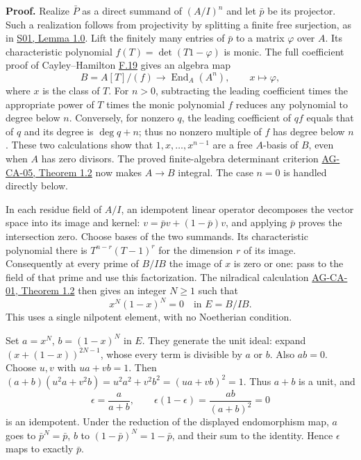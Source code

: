 \documentclass[11pt,a4paper,openany]{report}
\begin{document}
\textbf{Proof.} Realize \(\bar P\) as a direct summand of \((A/I)^n\) and let \(\bar p\) be its projector. Such a realization follows from projectivity by splitting a finite free surjection, as in \href{https://github.com/KokunoYumeto/open-math-courses/blob/main/docs/courses/AG-RG/AG-RG-S01.md}{S01, Lemma 1.0}. Lift the finitely many entries of \(\bar p\) to a matrix \(\varphi\) over \(A\). Its characteristic polynomial \(f(T)=\det(T1-\varphi)\) is monic. The full coefficient proof of Cayley--Hamilton \hyperref[AG-RG-S05-algebra-lemma-charpoly]{F.19} gives an algebra map \[
B=A[T]/(f)\longrightarrow\operatorname{End}_A(A^n),
\qquad x\longmapsto\varphi,
\] where \(x\) is the class of \(T\). For \(n>0\), subtracting the leading coefficient times the appropriate power of \(T\) times the monic polynomial \(f\) reduces any polynomial to degree below \(n\). Conversely, for nonzero \(q\), the leading coefficient of \(qf\) equals that of \(q\) and its degree is \(\deg q+n\); thus no nonzero multiple of \(f\) has degree below \(n\). These two calculations show that \(1,x,\ldots,x^{n-1}\) are a free \(A\)-basis of \(B\), even when \(A\) has zero divisors. The proved finite-algebra determinant criterion \href{https://github.com/KokunoYumeto/open-math-courses/blob/d02d0a3669f42579db037cd44de1d113fdd770a1/docs/courses/AG-CA/src/integral-extensions-lying-over-going-up-and-going-down.md}{AG-CA-05, Theorem 1.2} now makes \(A\to B\) integral. The case \(n=0\) is handled directly below.

In each residue field of \(A/I\), an idempotent linear operator decomposes the vector space into its image and kernel: \(v=\bar p v+(1-\bar p)v\), and applying \(\bar p\) proves the intersection zero. Choose bases of the two summands. Its characteristic polynomial there is \(T^{n-r}(T-1)^r\) for the dimension \(r\) of its image. Consequently at every prime of \(B/IB\) the image of \(x\) is zero or one: pass to the field of that prime and use this factorization. The nilradical calculation \href{https://github.com/KokunoYumeto/open-math-courses/blob/d02d0a3669f42579db037cd44de1d113fdd770a1/docs/courses/AG-CA/src/spectra-of-rings.md}{AG-CA-01, Theorem 1.2} then gives an integer \(N\ge1\) such that \[
x^N(1-x)^N=0\quad\text{in }E=B/IB.
\] This uses a single nilpotent element, with no Noetherian condition.

Set \(a=x^N\), \(b=(1-x)^N\) in \(E\). They generate the unit ideal: expand \((x+(1-x))^{2N-1}\), whose every term is divisible by \(a\) or \(b\). Also \(ab=0\). Choose \(u,v\) with \(ua+vb=1\). Then \((a+b)(u^2a+v^2b)=u^2a^2+v^2b^2=(ua+vb)^2=1\). Thus \(a+b\) is a unit, and \[
\epsilon=\frac{a}{a+b},\qquad
\epsilon(1-\epsilon)=\frac{ab}{(a+b)^2}=0
\] is an idempotent. Under the reduction of the displayed endomorphism map, \(a\) goes to \(\bar p^N=\bar p\), \(b\) to \((1-\bar p)^N=1-\bar p\), and their sum to the identity. Hence \(\epsilon\) maps to exactly \(\bar p\).
\end{document}
